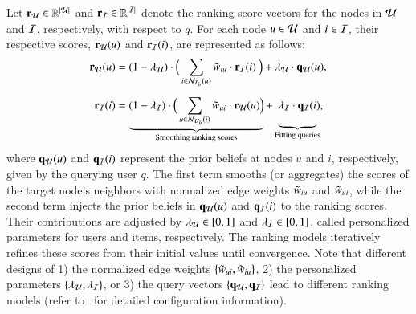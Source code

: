 Let $\mathbf{r}_{\mathcal{U}} \in \mathbb{R}^{|\mathcal{U}|}$ and $\mathbf{r}_{\mathcal{I}} \in \mathbb{R}^{|\mathcal{I}|}$ denote the ranking score vectors for the nodes in $\mathcal{U}$ and $\mathcal{I}$, respectively, with respect to $q$.
For each node $u \in \mathcal{U}$ and $i \in \mathcal{I}$, their respective scores, $\mathbf{r}_{\mathcal{U}}(u)$ and $\mathbf{r}_{\mathcal{I}}(i)$, are represented as follows:
\begin{align}
    \label{eq:birank}
    \begin{split}
    \ru(u) &= (1-\lambda_{\users}) \cdot
    \Big(
         \sum_{i \in \NIb{u}} \wiu \cdot \ri(i) \
    \Big) + \lambda_{\users}\cdot\qu(u), \\
    \ri(i) &= \underbrace{(1-\lambda_{\items}) \cdot \Big(
    \sum_{u \in \NUb{i}}{\wui \cdot \ru(u)} 
    \Big)}_{\text{Smoothing ranking scores}}
    + \underbrace{\lambda_{\items} \cdot \qi(i), 
        {\color{white}\Biggl(_{B_{B_{B}}}\!\!\!\!\!\!\!\!\!\!\!\!\!\!}
    }_{\text{Fitting queries}} 
    \end{split}
\end{align}
where $\mathbf{q}_{\mathcal{U}}(u)$ and $\mathbf{q}_{\mathcal{I}}(i)$ represent the prior beliefs at nodes $u$ and $i$, respectively, given by the querying user $q$.
The first term smooths (or aggregates) the scores of the target node’s neighbors with normalized edge weights $\tilde{w}_{iu}$ and $\tilde{w}_{ui}$, while the second term injects the prior beliefs in $\mathbf{q}_{\mathcal{U}}(u)$ and $\mathbf{q}_{\mathcal{I}}(i)$ to the ranking scores. 
Their contributions are adjusted by $\lambda_{\mathcal{U}} \in [0,1]$ and $\lambda_{\mathcal{I}} \in [0,1]$, called personalized parameters for users and items, respectively. 
The ranking models iteratively refines these scores from their initial values until convergence.
Note that different designs of 1) the normalized edge weights $\{\tilde{w}_{ui}, \tilde{w}_{iu}\}$, 2) the personalized parameters $\{\lambda_{\mathcal{U}}, \lambda_{\mathcal{I}}\}$, or 3) the query vectors $\{\mathbf{q}_{\mathcal{U}}, \mathbf{q}_{\mathcal{I}}\}$ lead to different ranking models (refer to~\cite{HeHGKW17} for detailed configuration information).
